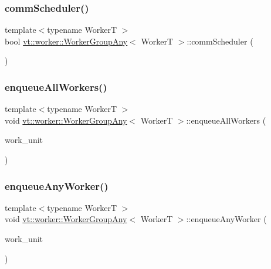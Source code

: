 \subsubsection{\texorpdfstring{comm\+Scheduler()}{commScheduler()}}
{\footnotesize\ttfamily template$<$typename WorkerT $>$ \\
bool \hyperlink{structvt_1_1worker_1_1_worker_group_any}{vt\+::worker\+::\+Worker\+Group\+Any}$<$ WorkerT $>$\+::comm\+Scheduler (\begin{DoxyParamCaption}{ }\end{DoxyParamCaption})}

\mbox{\label{structvt_1_1worker_1_1_worker_group_any_a87944f965a0e1a918257be0ceff011a5}} 
\subsubsection{\texorpdfstring{enqueue\+All\+Workers()}{enqueueAllWorkers()}}
{\footnotesize\ttfamily template$<$typename WorkerT $>$ \\
void \hyperlink{structvt_1_1worker_1_1_worker_group_any}{vt\+::worker\+::\+Worker\+Group\+Any}$<$ WorkerT $>$\+::enqueue\+All\+Workers (\begin{DoxyParamCaption}\item[{\hyperlink{namespacevt_1_1worker_a59d2fcdafa81fc0af7f921a258e42202}{Work\+Unit\+Type} const \&}]{work\+\_\+unit }\end{DoxyParamCaption})}

\mbox{\label{structvt_1_1worker_1_1_worker_group_any_a9f8a255853db11824212dcba4faaaf13}} 
\subsubsection{\texorpdfstring{enqueue\+Any\+Worker()}{enqueueAnyWorker()}}
{\footnotesize\ttfamily template$<$typename WorkerT $>$ \\
void \hyperlink{structvt_1_1worker_1_1_worker_group_any}{vt\+::worker\+::\+Worker\+Group\+Any}$<$ WorkerT $>$\+::enqueue\+Any\+Worker (\begin{DoxyParamCaption}\item[{\hyperlink{namespacevt_1_1worker_a59d2fcdafa81fc0af7f921a258e42202}{Work\+Unit\+Type} const \&}]{work\+\_\+unit }\end{DoxyParamCaption})}

